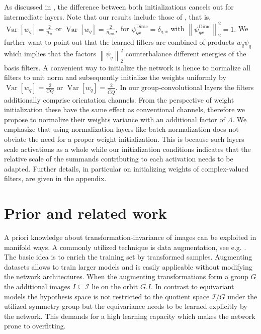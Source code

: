 \documentclass[10pt,twocolumn,letterpaper]{article}
\newcommand{\Var}{\operatorname{Var}}
\newcommand{\norm}[1]{\left\lVert #1 \right\rVert}
\begin{document}
As discussed in \cite{DBLP:journals/corr/HeZR015}, the difference between both initializations cancels out for intermediate layers.
Note that our results include those of \citet{DBLP:journals/corr/HeZR015}, that is, $\Var\left[w_q\right]=\frac{2}{n_\text{in}}$ or $ \Var\left[w_q\right]=\frac{2}{n_\text{out}},$ for $\psi_{qx}^\text{Dirac}=\delta_{q,x}$ with $\norm{\psi_{qx}^\text{Dirac}}_2^2=1.$
We further want to point out that the learned filters are combined of products $w_q\psi_q$ which implies that the factors $\norm{\psi_q}_2^2$ counterbalance different energies of the basis filters.
A convenient way to initialize the network is hence to normalize all filters to unit norm and subsequently initialize the weights uniformly by $\Var\left[w_q\right]=\frac{2}{CQ}$ or $\Var\left[w_q\right]=\frac{2}{\hat{C}Q}.$
In our group-convolutional layers the filters additionally comprise orientation channels.
From the perspective of weight initialization these have the same effect as conventional channels, therefore we propose to normalize their weights variance with an additional factor of $\Lambda.$
We emphasize that using normalization layers like batch normalization does not obviate the need for a proper weight initialization.
This is because such layers scale activations as a whole while our initialization conditions indicates that the relative scale of the summands contributing to each activation needs to be adapted.
Further details, in particular on initializing weights of complex-valued filters, are given in the appendix.



\section{Prior and related work}

A priori knowledge about transformation-invariance of images can be exploited in manifold ways.
A commonly utilized technique is data augmentation, see e.g. \cite{krizhevsky2012imagenet}.
The basic idea is to enrich the training set by transformed samples.
Augmenting datasets allows to train larger models and is easily applicable without modifying the network architectures.
When the augmenting transformations form a group $G$ the additional images $I\subseteq\mathcal{I}$ lie on the orbit $G.I$.
In contrast to equivariant models the hypothesis space is not restricted to the quotient space $\mathcal{I}/G$ under the utilized symmetry group but the equivariance needs to be learned explicitly by the network.
This demands for a high learning capacity which makes the network prone to overfitting.
\end{document}
